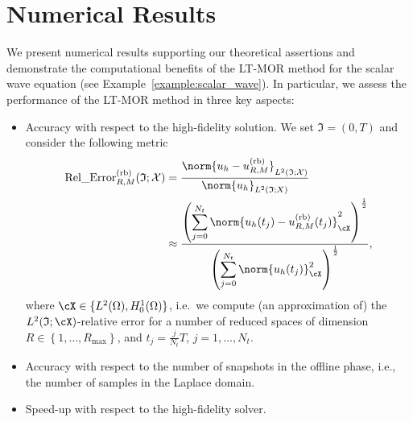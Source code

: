 \section{Numerical Results}
\label{sec:numerical_results}
We present numerical results supporting our theoretical assertions
and demonstrate the computational benefits of the LT-MOR method for the scalar wave equation
(see Example~\ref{example:scalar_wave}).
In particular, we assess the performance of the LT-MOR method
in three key aspects: 
\begin{itemize}
	\item[(i)]
	Accuracy with respect to the high-fidelity solution.
	We set $\mathfrak{I} = (0,T)$ and 
	consider the following metric
	\begin{equation}\label{eq:rel_error}
	\begin{aligned}
		\text{Rel\_Error}^{\normalfont\text{(rb)}}_{R,M}(\mathfrak{I};\mathcal{X})
		&
		=
		\frac{
			\norm{
				u_h - u^{\normalfont\text{(rb)}}_{R,M}
			}_{L^2(\mathfrak{I};\mathcal{X})}
		}{
			\norm{
				u_h
			}_{L^2(\mathfrak{I};X)}
		}
		\\
		&
		\approx
		\frac{
			\left(
			\displaystyle\sum_{j=0}^{N_t}
			\norm{
				u_h(t_j) - u^{\normalfont\text{(rb)}}_{R,M}(t_j)
			}^2_{\cX}
			\right)^{\frac{1}{2}}
		}{
			\left(
			\displaystyle\sum_{j=0}^{N_t}
			\norm{
				u_h(t_j)
			}^2_{\cX}
			\right)^{\frac{1}{2}}
		},
	\end{aligned}
	\end{equation}
	where $\cX \in \{L^2(\Omega),H^1_0(\Omega)\}$, i.e.~we
	compute (an approximation of) the $L^2(\mathfrak{I};\cX)$-relative error for a number of reduced spaces of dimension $R \in \left\{1,\dots,R_{\text{max}}\right\}$, and $t_j = \frac{j}{N_t} T$, $j=1,\dots,N_t$.
	\item[(ii)]
	Accuracy with respect to the number of snapshots in the offline phase, i.e., the 
	number of samples in the Laplace domain.
    \item[(iii)]
	Speed-up with respect to the high-fidelity solver.
\end{itemize}

